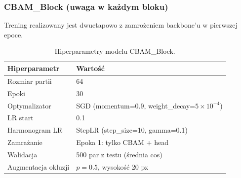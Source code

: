 \subsubsection{CBAM\_Block (uwaga w każdym bloku)}
Trening realizowany jest dwuetapowo z zamrożeniem backbone'u w pierwszej epoce.

\begin{table}[h]
\centering
\small
\begin{tabular}{ll}
\toprule
\textbf{Hiperparametr} & \textbf{Wartość} \\
\midrule
Rozmiar partii & 64 \\
Epoki & 30 \\
Optymalizator & SGD (momentum=0.9, weight\_decay=$5\times 10^{-4}$) \\
LR start & 0.1 \\
Harmonogram LR & StepLR (step\_size=10, gamma=0.1) \\
Zamrażanie & Epoka 1: tylko CBAM + head \\
Walidacja & 500 par z testu (średnia cos) \\
Augmentacja okluzji & $p=0.5$, wysokość 20 px \\
\bottomrule
\end{tabular}
\caption{Hiperparametry modelu CBAM\_Block.}
\label{tab:cbam_block_config}
\end{table}